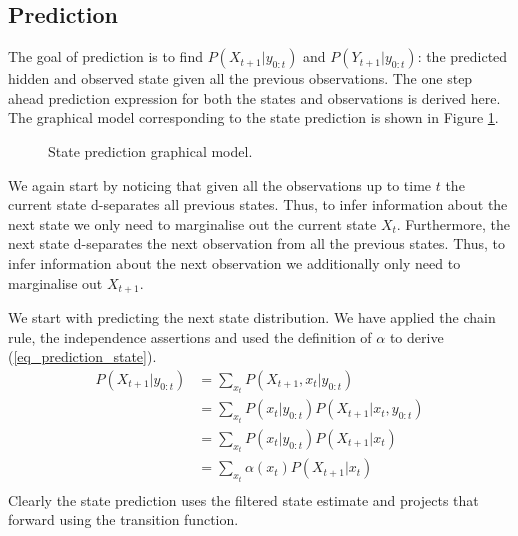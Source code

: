 \subsection{Prediction}
The goal of prediction is to find $P(X_{t+1}|y_{0:t})$ and $P(Y_{t+1}|y_{0:t})$: the predicted hidden and observed state given all the previous observations. The one step ahead prediction expression for both the states and observations is derived here. The graphical model corresponding to the state prediction is shown in Figure \ref{fig_linmod_pred_hmm}. 
\begin{figure}[H] 
\centering
{}
\caption{State prediction graphical model.}
\label{fig_linmod_pred_hmm}
\end{figure}
We again start by noticing that given all the observations  up to time $t$ the current state d-separates  all previous states. Thus, to infer information about the next state we only need to marginalise out the current state $X_t$. Furthermore, the next state d-separates the next observation from all the previous states. Thus, to infer information about the next observation we additionally only need to marginalise out $X_{t+1}$.

We start with predicting the next state distribution. We have applied the chain rule, the independence assertions and used the definition of $\alpha$ to derive (\ref{eq_prediction_state}).
\begin{equation}
\begin{aligned}
P(X_{t+1}|y_{0:t}) &= \sum_{x_t} P(X_{t+1}, x_t|y_{0:t}) \\
&= \sum_{x_t} P(x_t|y_{0:t})P(X_{t+1}|x_t, y_{0:t}) \\
&= \sum_{x_t} P(x_t|y_{0:t})P(X_{t+1}|x_t) \\
&= \sum_{x_t} \alpha(x_t)P(X_{t+1}|x_t) \\
\end{aligned}
\label{eq_prediction_state}
\end{equation}
Clearly the state prediction uses the filtered state estimate and projects that forward using the transition function.

